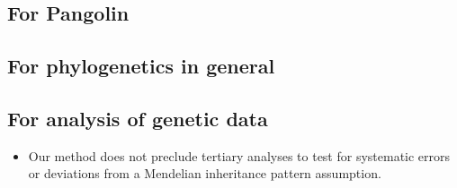 \documentclass[
]{article}
\providecommand{\tightlist}{%
  \setlength{\itemsep}{0pt}\setlength{\parskip}{0pt}}
\begin{document}
\hypertarget{for-pangolin}{%
\subsection{For Pangolin}\label{for-pangolin}}

\hypertarget{for-phylogenetics-in-general}{%
\subsection{For phylogenetics in
general}\label{for-phylogenetics-in-general}}

\hypertarget{for-analysis-of-genetic-data}{%
\subsection{For analysis of genetic
data}\label{for-analysis-of-genetic-data}}

\begin{itemize}
\tightlist
\item
  Our method does not preclude tertiary analyses to test for systematic
  errors or deviations from a Mendelian inheritance pattern assumption.
\end{itemize}

  
\end{document}
